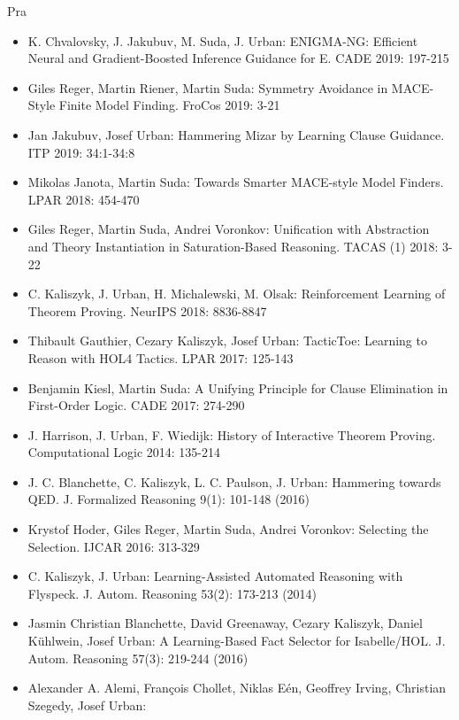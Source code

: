\begin{sitedescription}{Pra}
\begin{itemize}
\item K. Chvalovsky, J. Jakubuv, M. Suda, J. Urban: ENIGMA-NG: Efficient Neural and Gradient-Boosted Inference Guidance for E. CADE 2019: 197-215
  \item Giles Reger, Martin Riener, Martin Suda:
    Symmetry Avoidance in MACE-Style Finite Model Finding. FroCos 2019: 3-21
\item 	Jan Jakubuv, Josef Urban:
  Hammering Mizar by Learning Clause Guidance. ITP 2019: 34:1-34:8
  \item Mikolas Janota, Martin Suda:
Towards Smarter MACE-style Model Finders. LPAR 2018: 454-470
\item Giles Reger, Martin Suda, Andrei Voronkov:
Unification with Abstraction and Theory Instantiation in Saturation-Based Reasoning. TACAS (1) 2018: 3-22
\item C. Kaliszyk, J. Urban, H. Michalewski, M. Olsak: Reinforcement Learning of Theorem Proving. NeurIPS 2018: 8836-8847
   \item Thibault Gauthier, Cezary Kaliszyk, Josef Urban:
     TacticToe: Learning to Reason with HOL4 Tactics. LPAR 2017: 125-143
   \item Benjamin Kiesl, Martin Suda:
A Unifying Principle for Clause Elimination in First-Order Logic. CADE 2017: 274-290
    \item J. Harrison, J. Urban, F. Wiedijk: History of Interactive Theorem Proving. Computational Logic 2014: 135-214
    \item J. C. Blanchette, C. Kaliszyk, L. C. Paulson, J. Urban:
      Hammering towards QED. J. Formalized Reasoning 9(1): 101-148 (2016)
          \item 	Krystof Hoder, Giles Reger, Martin Suda, Andrei Voronkov:
Selecting the Selection. IJCAR 2016: 313-329
    \item C. Kaliszyk, J. Urban:
Learning-Assisted Automated Reasoning with Flyspeck. J. Autom. Reasoning 53(2): 173-213 (2014)
\item Jasmin Christian Blanchette, David Greenaway, Cezary Kaliszyk, Daniel Kühlwein, Josef Urban:
A Learning-Based Fact Selector for Isabelle/HOL. J. Autom. Reasoning 57(3): 219-244 (2016)
\item Alexander A. Alemi, François Chollet, Niklas Eén, Geoffrey Irving, Christian Szegedy, Josef Urban:

\end{itemize}
\end{sitedescription}
